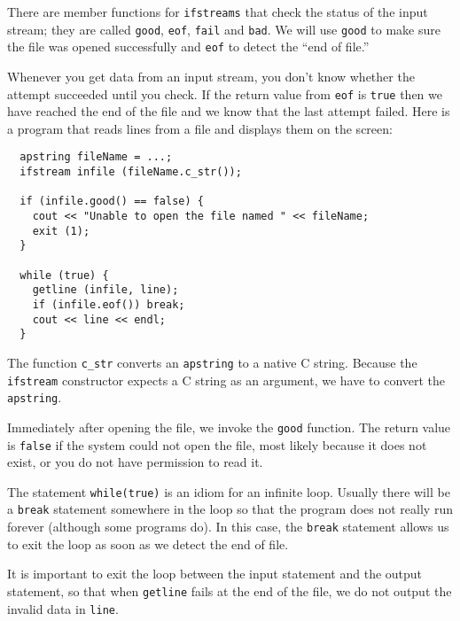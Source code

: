 There are member functions for {\tt ifstreams} that check the status
of the input stream; they are called {\tt good}, {\tt eof}, {\tt fail}
and {\tt bad}.  We will use {\tt good} to make sure the file was
opened successfully and {\tt eof} to detect the ``end of file.''


Whenever you get data from an input stream, you don't
know whether the attempt succeeded until you check.  If the
return value from {\tt eof} is {\tt true} then we have reached
the end of the file and we know that the last attempt failed.
Here is a program that reads lines from a file and displays
them on the screen:

\begin{verbatim}
  apstring fileName = ...;
  ifstream infile (fileName.c_str());

  if (infile.good() == false) {
    cout << "Unable to open the file named " << fileName;
    exit (1);
  }

  while (true) {
    getline (infile, line);
    if (infile.eof()) break;
    cout << line << endl;
  }
\end{verbatim}
%
The function {\tt c\_str} converts an {\tt apstring} to a
native C string.  Because the {\tt ifstream} constructor
expects a C string as an argument, we have to convert
the {\tt apstring}.


Immediately after opening the file, we invoke the {\tt good} function.
The return value is {\tt false} if the system could not open the file,
most likely because it does not exist, or you do not have permission
to read it.


The statement {\tt while(true)} is an idiom for an infinite
loop.  Usually there will be a {\tt break} statement somewhere in
the loop so that the program does not really run forever (although
some programs do).  In this case, the {\tt break} statement allows
us to exit the loop as soon as we detect the end of file.


It is important to exit the loop between the input statement and
the output statement, so that when {\tt getline} fails at the
end of the file, we do not output the invalid data in {\tt line}.

